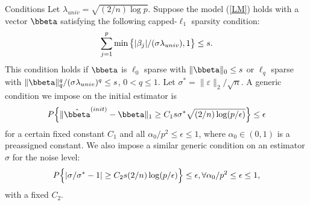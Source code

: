\begin{frame}
\begin{block}{Conditions}
\scriptsize
Let $\lambda_{univ}=\sqrt{(2/n)\log p}$. Suppose the model (\ref{LM}) holds with a vector $\bbeta$ satisfying the following capped-$\ell_1$ sparsity condition:
\begin{equation}
\label{con19}
\setlength{\abovedisplayskip}{3pt} %
\setlength{\belowdisplayskip}{3pt}
\sum_{j=1}^p \min\big\{|\beta_j|/(\sigma \lambda_{univ}),1\big\} \leq s.
\end{equation}
This condition holds if $\bbeta$ is $\ell_0$ sparse with $\|\bbeta\|_0 \leq s$ or $\ell_q$ sparse with $\|\bbeta\|_q^q/(\sigma\lambda_{univ})^q \leq s$, $0<q \leq 1$.
Let $\sigma^*=\|\varepsilon\|_2/\sqrt{n}$. A generic condition we impose on the initial estimator is
\begin{equation}
\label{con20}
\setlength{\abovedisplayskip}{3pt} %
\setlength{\belowdisplayskip}{3pt}
P\Big\{ \|\hat{\bbeta}^{(init)} - \bbeta\|_1 \geq C_1 s \sigma^*\sqrt{(2/n)\log(p/\epsilon)}\Big\} \leq \epsilon
\end{equation}
for a certain fixed constant $C_1$ and all $\alpha_0/p^2 \leq \epsilon \leq 1$,
where $\alpha_0\in (0,1)$ is a preassigned constant.
We also impose a similar generic condition on an estimator $\hat{\sigma}$ for the noise level:
\begin{equation}
\setlength{\abovedisplayskip}{3pt} %
\setlength{\belowdisplayskip}{3pt}
\label{con21}
P\Big\{ |\sigma/\sigma^* - 1 | \geq C_2 s (2/n)\log(p/\epsilon) \Big\} \leq \epsilon, \forall \alpha_0/p^2 \leq \epsilon \leq 1,
\end{equation}
with a fixed $C_2$.
\end{block}
\end{frame}


